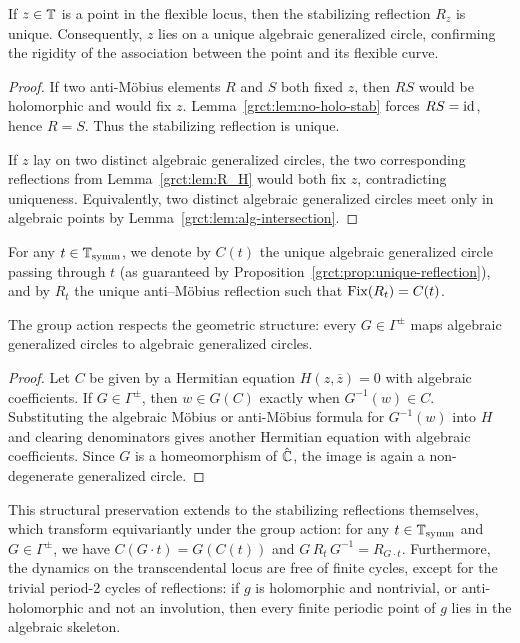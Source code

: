 \begin{proposition}\label{grct:prop:unique-reflection}
	If $z\in\mathbb{T}$ is a point in the flexible locus, then the stabilizing reflection $R_z$ is unique. Consequently, $z$ lies on a unique algebraic generalized circle, confirming the rigidity of the association between the point and its flexible curve.
\end{proposition}
\begin{proof}
	If two anti-Möbius elements $R$ and $S$ both fixed $z$, then $RS$ would be holomorphic and would fix $z$. Lemma~\ref{grct:lem:no-holo-stab} forces $RS=\mathrm{id}$, hence $R=S$. Thus the stabilizing reflection is unique.
	
	If $z$ lay on two distinct algebraic generalized circles, the two corresponding reflections from Lemma~\ref{grct:lem:R_H} would both fix $z$, contradicting uniqueness. Equivalently, two distinct algebraic generalized circles meet only in algebraic points by Lemma~\ref{grct:lem:alg-intersection}.
\end{proof}

\begin{remark}\label{grct:rem:CtRt}
	For any $t\in\mathbb{T}_{\mathrm{symm}}$, we denote by $C(t)$ the unique algebraic generalized circle passing through $t$ (as guaranteed by Proposition~\ref{grct:prop:unique-reflection}), and by $R_t$ the unique anti–Möbius reflection such that $\operatorname{Fix}(R_t)=C(t)$.
\end{remark}

\begin{lemma}\label{grct:lem:G-preserves-circles}
	The group action respects the geometric structure: every $G\in\Gamma^{\pm}$ maps algebraic generalized circles to algebraic generalized circles.
\end{lemma}
\begin{proof}
	Let $C$ be given by a Hermitian equation $H(z,\overline z)=0$ with algebraic coefficients. If $G\in\Gamma^{\pm}$, then $w\in G(C)$ exactly when $G^{-1}(w)\in C$. Substituting the algebraic Möbius or anti-Möbius formula for $G^{-1}(w)$ into $H$ and clearing denominators gives another Hermitian equation with algebraic coefficients. Since $G$ is a homeomorphism of $\hat{\mathbb{C}}$, the image is again a non-degenerate generalized circle.
\end{proof}

This structural preservation extends to the stabilizing reflections themselves, which transform equivariantly under the group action: for any $t\in\mathbb{T}_{\mathrm{symm}}$ and $G\in\Gamma^{\pm}$, we have $C(G\cdot t)=G(C(t))$ and $G\,R_{t}\,G^{-1}=R_{G\cdot t}$. Furthermore, the dynamics on the transcendental locus are free of finite cycles, except for the trivial period-2 cycles of reflections: if $g$ is holomorphic and nontrivial, or anti-holomorphic and not an involution, then every finite periodic point of $g$ lies in the algebraic skeleton.

